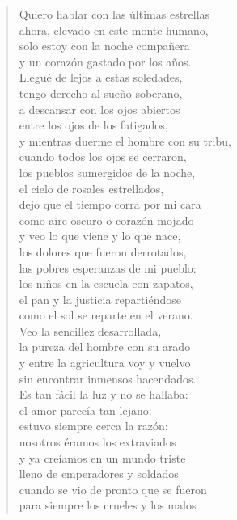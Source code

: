 \documentclass[12pt]{article}
\begin{document}
\clearpage
{}
\begin{verse}

Quiero hablar con las últimas estrellas\\
ahora, elevado en este monte humano,\\
solo estoy con la noche compañera\\
y un corazón gastado por los años.\\
Llegué de lejos a estas soledades,\\
tengo derecho al sueño soberano,\\
a descansar con los ojos abiertos\\
entre los ojos de los fatigados,\\
y mientras duerme el hombre con su tribu,\\
cuando todos los ojos se cerraron,\\
los pueblos sumergidos de la noche,\\
el cielo de rosales estrellados,\\
dejo que el tiempo corra por mi cara\\
como aire oscuro o corazón mojado\\
y veo lo que viene y lo que nace,\\
los dolores que fueron derrotados,\\
las pobres esperanzas de mi pueblo:\\
los niños en la escuela con zapatos,\\
el pan y la justicia repartiéndose\\
como el sol se reparte en el verano.\\
Veo la sencillez desarrollada,\\
la pureza del hombre con su arado\\
y entre la agricultura voy y vuelvo\\
sin encontrar inmensos hacendados.\\
Es tan fácil la luz y no se hallaba:\\
el amor parecía tan lejano:\\
estuvo siempre cerca la razón:\\
nosotros éramos los extraviados\\
y ya creíamos en un mundo triste\\
lleno de emperadores y soldados\\
cuando se vio de pronto que se fueron\\
para siempre los crueles y los malos\\

\end{verse}
\end{document}
